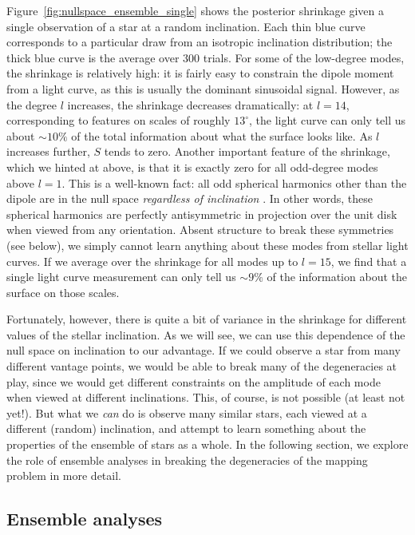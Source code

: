 \documentclass[modern]{aastex62}
\begin{document}
Figure~\ref{fig:nullspace_ensemble_single} shows the posterior shrinkage
given a single observation of a star at a random inclination.
Each thin blue curve corresponds to a particular draw from an isotropic
inclination distribution; the thick blue curve is the average over 300 trials.
For some of the low-degree modes, the shrinkage is relatively high: it is
fairly easy to constrain the dipole moment from a light curve, as this is
usually the dominant sinusoidal signal. However, as the degree $l$
increases, the shrinkage decreases dramatically: at $l = 14$, corresponding
to features on scales of roughly $13^\circ$, the light curve
can only tell us about $\sim 10\%$ of the total information about what the
surface looks like. As $l$ increases further, $S$ tends to zero.
Another important feature of the shrinkage, which we hinted at above,
is that it is exactly zero for
all odd-degree modes above $l = 1$. This is a well-known fact: all odd spherical
harmonics other than the dipole are in the null space \emph{regardless of
    inclination} \citep[e.g.,][]{Luger2019}. In other words, these spherical
harmonics are perfectly antisymmetric in projection over the unit disk
when viewed from any orientation. Absent structure to break these symmetries
(see below), we simply cannot learn anything about these modes from
stellar light curves. If we average over the shrinkage for all modes up to $l=15$,
we find that a single light curve measurement can only tell us $\sim 9\%$
of the information about the surface on those scales.

Fortunately, however, there is quite a bit of variance in the shrinkage
for different values of the stellar inclination.
As we will see, we can use this dependence of the null space on inclination to our
advantage. If we could observe a star from many different vantage points,
we would be able to break many of the degeneracies at play, since we
would get different constraints on the amplitude of each mode when viewed
at different inclinations. This, of course, is not possible (at least not
yet!). But what we \emph{can} do is observe many similar stars, each viewed
at a different (random) inclination, and attempt to learn something about
the properties of the ensemble of stars as a whole.
In the
following section, we explore the role of ensemble analyses in breaking
the degeneracies of the mapping problem in more detail.


\subsection{Ensemble analyses}
\label{sec:ensemble}
\end{document}
